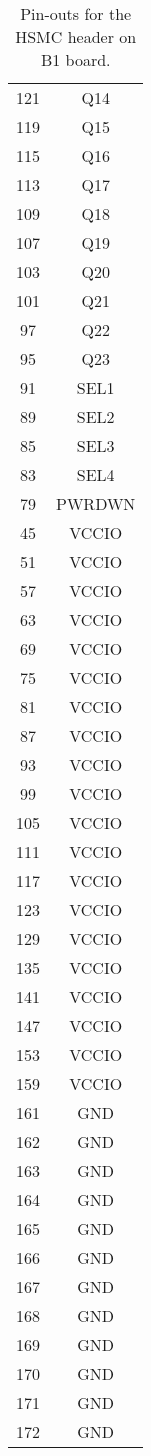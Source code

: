 \begin{table}[h]
\begin{tabular}{|c|c|}
121 & Q14 \\
119 & Q15 \\
115 & Q16 \\
113 & Q17 \\
109 & Q18 \\
107 & Q19 \\
103 & Q20 \\
101 & Q21 \\
97 & Q22 \\
95 & Q23 \\
91 & SEL1 \\
89 & SEL2 \\
85 & SEL3 \\
83 & SEL4 \\
79 & PWRDWN \\
45 & VCCIO \\
51 & VCCIO \\
57 & VCCIO \\
63 & VCCIO \\
69 & VCCIO \\
75 & VCCIO \\
81 & VCCIO \\
87 & VCCIO \\
93 & VCCIO \\
99 & VCCIO \\
105 & VCCIO \\
111 & VCCIO \\
117 & VCCIO \\
123 & VCCIO \\
129 & VCCIO \\
135 & VCCIO \\
141 & VCCIO \\
147 & VCCIO \\
153 & VCCIO \\
159 & VCCIO \\
161 & GND \\
162 & GND \\
163 & GND \\
164 & GND \\
165 & GND \\
166 & GND \\
167 & GND \\
168 & GND \\
169 & GND \\
170 & GND \\
171 & GND \\
172 & GND \\
\end{tabular}
\caption{Pin-outs for the HSMC header on B1 board.}
\label{tab:b1_hsmc_pinout}
\end{table}

